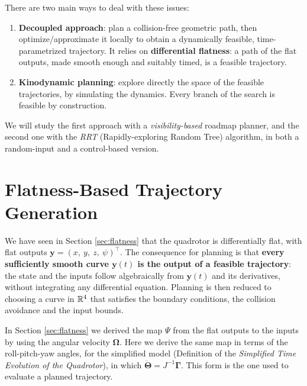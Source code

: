 \documentclass[10pt, a4paper]{report}
\newcommand{\y}{{\mathbf y}}
\begin{document}
\noindent There are two main ways to deal with these issues:\begin{enumerate}
    \item \textbf{Decoupled approach}: plan a collision-free geometric path, then optimize/approximate it locally to obtain a dynamically feasible, time-parametrized trajectory. It relies on \textbf{differential flatness}: a path of the flat outputs, made smooth enough and suitably timed, is a feasible trajectory.
    \item \textbf{Kinodynamic planning}: explore directly the space of the feasible trajectories, by simulating the dynamics. Every branch of the search is feasible by construction.
\end{enumerate}
\noindent We will study the first approach with a \textit{visibility-based} roadmap planner, and the second one with the \textit{RRT} (Rapidly-exploring Random Tree) algorithm, in both a random-input and a control-based version.
\section{Flatness-Based Trajectory Generation}
We have seen in Section \ref{sec:flatness} that the quadrotor is differentially flat, with flat outputs $\y=(x,\ y,\ z,\ \psi)^\top$. The consequence for planning is that \textbf{every sufficiently smooth curve $\y(t)$ is the output of a feasible trajectory}: the state and the inputs follow algebraically from $\y(t)$ and its derivatives, without integrating any differential equation. Planning is then reduced to choosing a curve in ${\mathbb R}^4$ that satisfies the boundary conditions, the collision avoidance and the input bounds.\bigskip

\noindent In Section \ref{sec:flatness} we derived the map $\Psi$ from the flat outputs to the inputs by using the angular velocity $\boldsymbol{\Omega}$. Here we derive the same map in terms of the roll-pitch-yaw angles, for the simplified model (Definition of the \textit{Simplified Time Evolution of the Quadrotor}), in which $\ddot{\boldsymbol{\Theta}}=J^{-1}\boldsymbol{\Gamma}$. This form is the one used to evaluate a planned trajectory.
\end{document}
